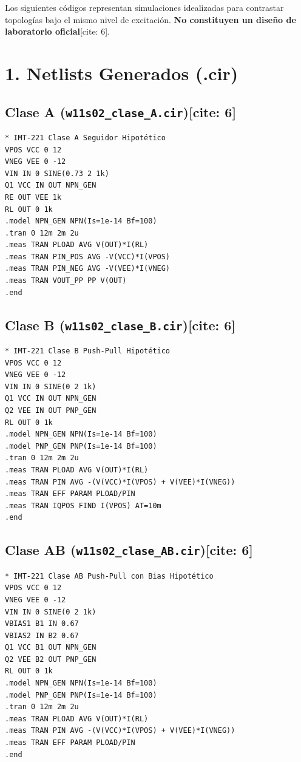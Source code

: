 \documentclass[11pt, a4paper]{article}
\begin{document}
\begin{tcolorbox}[colback=ucbblue!5, colframe=ucbblue, title=\textbf{Paquete LTspice: Hipótesis Didácticas A/B/AB {[cite: 6]}}]
    Los siguientes códigos representan simulaciones idealizadas para contrastar topologías bajo el mismo nivel de excitación. \textbf{No constituyen un diseño de laboratorio oficial}[cite: 6].
\end{tcolorbox}

\section*{1. Netlists Generados (.cir)}

\subsection*{Clase A (\texttt{w11s02\_clase\_A.cir})[cite: 6]}
\begin{verbatim}
* IMT-221 Clase A Seguidor Hipotético
VPOS VCC 0 12
VNEG VEE 0 -12
VIN IN 0 SINE(0.73 2 1k)
Q1 VCC IN OUT NPN_GEN
RE OUT VEE 1k
RL OUT 0 1k
.model NPN_GEN NPN(Is=1e-14 Bf=100)
.tran 0 12m 2m 2u
.meas TRAN PLOAD AVG V(OUT)*I(RL)
.meas TRAN PIN_POS AVG -V(VCC)*I(VPOS)
.meas TRAN PIN_NEG AVG -V(VEE)*I(VNEG)
.meas TRAN VOUT_PP PP V(OUT)
.end
\end{verbatim}

\subsection*{Clase B (\texttt{w11s02\_clase\_B.cir})[cite: 6]}
\begin{verbatim}
* IMT-221 Clase B Push-Pull Hipotético
VPOS VCC 0 12
VNEG VEE 0 -12
VIN IN 0 SINE(0 2 1k)
Q1 VCC IN OUT NPN_GEN
Q2 VEE IN OUT PNP_GEN
RL OUT 0 1k
.model NPN_GEN NPN(Is=1e-14 Bf=100)
.model PNP_GEN PNP(Is=1e-14 Bf=100)
.tran 0 12m 2m 2u
.meas TRAN PLOAD AVG V(OUT)*I(RL)
.meas TRAN PIN AVG -(V(VCC)*I(VPOS) + V(VEE)*I(VNEG))
.meas TRAN EFF PARAM PLOAD/PIN
.meas TRAN IQPOS FIND I(VPOS) AT=10m
.end
\end{verbatim}

\subsection*{Clase AB (\texttt{w11s02\_clase\_AB.cir})[cite: 6]}
\begin{verbatim}
* IMT-221 Clase AB Push-Pull con Bias Hipotético
VPOS VCC 0 12
VNEG VEE 0 -12
VIN IN 0 SINE(0 2 1k)
VBIAS1 B1 IN 0.67
VBIAS2 IN B2 0.67
Q1 VCC B1 OUT NPN_GEN
Q2 VEE B2 OUT PNP_GEN
RL OUT 0 1k
.model NPN_GEN NPN(Is=1e-14 Bf=100)
.model PNP_GEN PNP(Is=1e-14 Bf=100)
.tran 0 12m 2m 2u
.meas TRAN PLOAD AVG V(OUT)*I(RL)
.meas TRAN PIN AVG -(V(VCC)*I(VPOS) + V(VEE)*I(VNEG))
.meas TRAN EFF PARAM PLOAD/PIN
.end
\end{verbatim}
\end{document}
